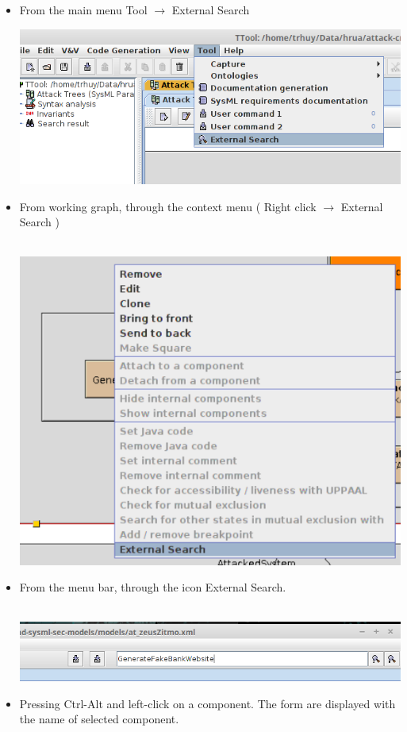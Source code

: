 \documentclass[a4paper,12pt,oneside]{report}
\begin{document}
		\begin {itemize}
		\item From the main menu Tool $\rightarrow$ External Search\par
		\begin{center}
		\includegraphics[scale=0.6]{mainmenu_crop.png}
		\end{center}
		\item From  working graph, through the context menu ( Right click  $\rightarrow$ External Search ) \\\\
		\begin{center}
		\includegraphics[scale=0.5]{contextmenu_crop.png}
		\end{center}
		\item From the menu bar, through the icon External Search.\\\\
		\begin{center}
		\includegraphics[scale=0.6]{menubar.png}
		\end{center}
		\item  Pressing Ctrl-Alt and left-click on a component. The form are displayed with the name of selected component.
		
		\end{itemize}
\end{document}
